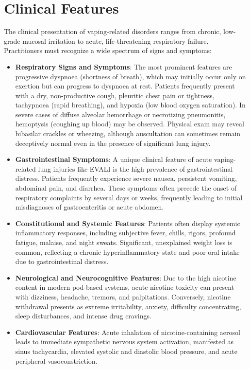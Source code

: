 \section*{Clinical Features}
The clinical presentation of vaping-related disorders ranges from chronic, low-grade mucosal irritation to acute, life-threatening respiratory failure. Practitioners must recognize a wide spectrum of signs and symptoms:
\begin{itemize}
    \item \textbf{Respiratory Signs and Symptoms}: The most prominent features are progressive dyspnoea (shortness of breath), which may initially occur only on exertion but can progress to dyspnoea at rest. Patients frequently present with a dry, non-productive cough, pleuritic chest pain or tightness, tachypnoea (rapid breathing), and hypoxia (low blood oxygen saturation). In severe cases of diffuse alveolar hemorrhage or necrotizing pneumonitis, hemoptysis (coughing up blood) may be observed. Physical exam may reveal bibasilar crackles or wheezing, although auscultation can sometimes remain deceptively normal even in the presence of significant lung injury.
    \item \textbf{Gastrointestinal Symptoms}: A unique clinical feature of acute vaping-related lung injuries like EVALI is the high prevalence of gastrointestinal distress. Patients frequently experience severe nausea, persistent vomiting, abdominal pain, and diarrhea. These symptoms often precede the onset of respiratory complaints by several days or weeks, frequently leading to initial misdiagnoses of gastroenteritis or acute abdomen.
    \item \textbf{Constitutional and Systemic Features}: Patients often display systemic inflammatory responses, including subjective fever, chills, rigors, profound fatigue, malaise, and night sweats. Significant, unexplained weight loss is common, reflecting a chronic hyperinflammatory state and poor oral intake due to gastrointestinal distress.
    \item \textbf{Neurological and Neurocognitive Features}: Due to the high nicotine content in modern pod-based systems, acute nicotine toxicity can present with dizziness, headache, tremors, and palpitations. Conversely, nicotine withdrawal presents as extreme irritability, anxiety, difficulty concentrating, sleep disturbances, and intense drug cravings.
    \item \textbf{Cardiovascular Features}: Acute inhalation of nicotine-containing aerosol leads to immediate sympathetic nervous system activation, manifested as sinus tachycardia, elevated systolic and diastolic blood pressure, and acute peripheral vasoconstriction.
\end{itemize}

